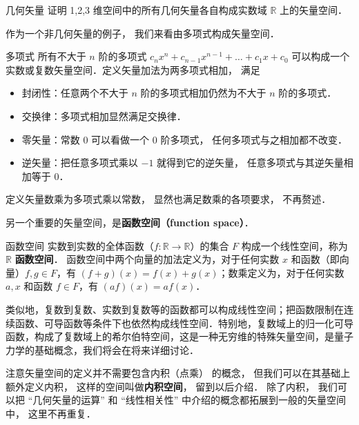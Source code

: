 \begin{exercise}{几何矢量}
证明 1,2,3 维空间中的所有几何矢量各自构成实数域 $\mathbb R$ 上的矢量空间．
\end{exercise}

作为一个非几何矢量的例子， 我们来看由多项式构成矢量空间．

\begin{example}{多项式}\label{LSpace_ex1}
所有不大于 $n$ 阶的多项式 $c_n x^n + c_{n-1} x^{n-1} + \dots + c_1 x + c_0$ 可以构成一个实数或复数矢量空间．定义矢量加法为两多项式相加， 满足
\begin{itemize}
\item 封闭性：任意两个不大于 $n$ 阶的多项式相加仍然为不大于 $n$ 阶的多项式．
\item 交换律：多项式相加显然满足交换律．
\item 零矢量：常数 0 可以看做一个 0 阶多项式， 任何多项式与之相加都不改变．
\item 逆矢量：把任意多项式乘以 $-1$ 就得到它的逆矢量， 任意多项式与其逆矢量相加等于 0．
\end{itemize}
定义矢量数乘为多项式乘以常数， 显然也满足数乘的各项要求， 不再赘述．
\end{example}

另一个重要的矢量空间，是\textbf{函数空间（function space）}．

\begin{example}{函数空间}\label{LSpace_ex2}
实数到实数的全体函数（$f:\mathbb R \to \mathbb R$）的集合 $F$ 构成一个线性空间，称为 $\mathbb{R}$ \textbf{函数空间}． 函数空间中两个向量的加法定义为，对于任何实数 $x$ 和函数（即向量）$f, g\in F$，有 $(f+g)(x)=f(x)+g(x)$；数乘定义为，对于任何实数 $a, x$ 和函数 $f\in F$，有 $(af)(x)=af(x)$．

类似地，复数到复数、实数到复数等的函数都可以构成线性空间；把函数限制在连续函数、可导函数等条件下也依然构成线性空间．特别地，复数域上的归一化可导函数，构成了复数域上的希尔伯特空间，这是一种无穷维的特殊矢量空间，是量子力学的基础概念，我们将会在将来详细讨论．
\end{example}

注意矢量空间的定义并不需要包含内积（点乘） 的概念， 但我们可以在其基础上额外定义内积， 这样的空间叫做\textbf{内积空间}， 留到以后介绍． 除了内积， 我们可以把 “几何矢量的运算” 和 “线性相关性” 中介绍的概念都拓展到一般的矢量空间中， 这里不再重复．

